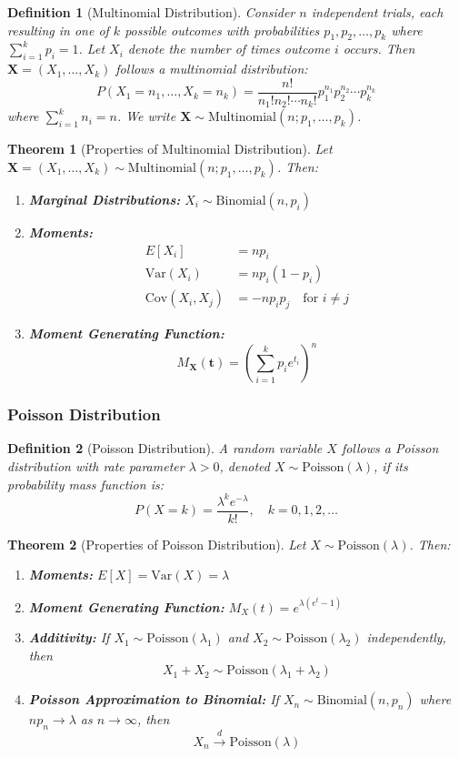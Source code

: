 \documentclass[12pt,a4paper]{article}
\newtheorem{theorem}{Theorem}[section]
\newtheorem{definition}{Definition}[section]
\theoremstyle{remark}
\begin{document}
\begin{definition}[Multinomial Distribution]
Consider $n$ independent trials, each resulting in one of $k$ possible outcomes with probabilities $p_1, p_2, \ldots, p_k$ where $\sum_{i=1}^k p_i = 1$. Let $X_i$ denote the number of times outcome $i$ occurs. Then $\mathbf{X} = (X_1, \ldots, X_k)$ follows a multinomial distribution:
$$P(X_1 = n_1, \ldots, X_k = n_k) = \frac{n!}{n_1! n_2! \cdots n_k!} p_1^{n_1} p_2^{n_2} \cdots p_k^{n_k}$$
where $\sum_{i=1}^k n_i = n$. We write $\mathbf{X} \sim \text{Multinomial}(n; p_1, \ldots, p_k)$.
\end{definition}

\begin{theorem}[Properties of Multinomial Distribution]
Let $\mathbf{X} = (X_1, \ldots, X_k) \sim \text{Multinomial}(n; p_1, \ldots, p_k)$. Then:
\begin{enumerate}
\item \textbf{Marginal Distributions:} $X_i \sim \text{Binomial}(n, p_i)$
\item \textbf{Moments:}
   \begin{align}
   E[X_i] &= np_i\\
   \text{Var}(X_i) &= np_i(1 - p_i)\\
   \text{Cov}(X_i, X_j) &= -np_ip_j \quad \text{for } i \neq j
   \end{align}
\item \textbf{Moment Generating Function:}
   $$M_{\mathbf{X}}(\mathbf{t}) = \left(\sum_{i=1}^k p_i e^{t_i}\right)^n$$
\end{enumerate}
\end{theorem}

\subsubsection{Poisson Distribution}

\begin{definition}[Poisson Distribution]
A random variable $X$ follows a Poisson distribution with rate parameter $\lambda > 0$, denoted $X \sim \text{Poisson}(\lambda)$, if its probability mass function is:
$$P(X = k) = \frac{\lambda^k e^{-\lambda}}{k!}, \quad k = 0, 1, 2, \ldots$$
\end{definition}

\begin{theorem}[Properties of Poisson Distribution]
Let $X \sim \text{Poisson}(\lambda)$. Then:
\begin{enumerate}
\item \textbf{Moments:} $E[X] = \text{Var}(X) = \lambda$
\item \textbf{Moment Generating Function:} $M_X(t) = e^{\lambda(e^t - 1)}$
\item \textbf{Additivity:} If $X_1 \sim \text{Poisson}(\lambda_1)$ and $X_2 \sim \text{Poisson}(\lambda_2)$ independently, then
   $$X_1 + X_2 \sim \text{Poisson}(\lambda_1 + \lambda_2)$$
\item \textbf{Poisson Approximation to Binomial:} If $X_n \sim \text{Binomial}(n, p_n)$ where $np_n \to \lambda$ as $n \to \infty$, then
   $$X_n \stackrel{d}{\to} \text{Poisson}(\lambda)$$
\end{enumerate}
\end{theorem}
\end{document}
